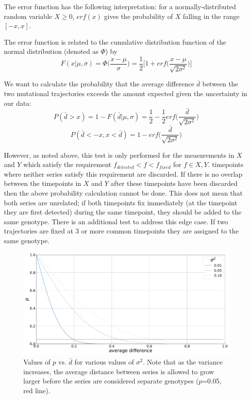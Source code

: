 \documentclass{report}
\begin{document}
The error function has the following interpretation: for a normally-distributed random variable $X \ge 0$, $erf(x)$ gives the probability of $X$ falling in the range $[-x,x]$.

The error function is related to the cumulative distribution function of the normal distribution (denoted as $\Phi$) by
\begin{equation}
F(x|\mu,\sigma) = \Phi\bigg(\frac{x-\mu}{\sigma}\bigg)= \frac{1}{2}\bigg[1 + erf \bigg(\frac{x-\mu}{\sqrt{2\sigma^2}}\bigg)\bigg]
\end{equation}

We want to calculate the probability that the average difference $\bar{d}$ between the two mutational trajectories exceeds the amount expected given the uncertainty in our data:
\[
P(\bar{d} > x) = 1-F(\bar{d}|\mu, \sigma) = \frac{1}{2} - \frac{1}{2}erf \bigg(\frac{\bar{d}}{\sqrt{2\sigma^2}}\bigg)
\]
\begin{equation}
P(\bar{d}<-x, x < \bar{d}) = 1 - erf \bigg(\frac{\bar{d}}{\sqrt{2\sigma^2}}\bigg)
\end{equation}

However, as noted above, this test is only performed for the measurements in $X$ and $Y$ which satisfy the requirement $f_{detected} < f <f_{fixed}$ for $f \in X,Y$. timepoints where neither series satisfy this requirement are discarded. If there is no overlap between the timepoints in $X$ and $Y$ after these timepoints have been discarded then the above probability calculation cannot be done. This does not mean that both series are unrelated; if both timepoints fix immediately (at the timepoint they are first detected) during the same timepoint, they should be added to the same genotype. There is an additional test to address this edge case. If two trajectories are fixed at 3 or more common timepoints they are assigned to the same genotype.
\begin{figure}[h]
  \caption{Values of $p$ vs. $\bar{d}$ for various values of $\sigma^2$. Note that as the variance increases, the average distance between series is allowed to grow larger before the series are considered separate genotypes ($p$=0.05, red line).}
  \includegraphics[width=\linewidth]{binomial_probability.pdf}
\end{figure}
\end{document}
